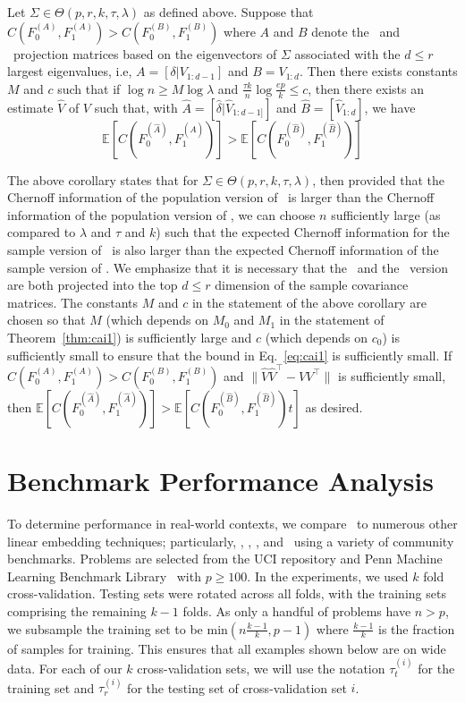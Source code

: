 \documentclass[11pt]{extarticle}
\begin{document}
\begin{coro}
Let $\Sigma \in \Theta(p,r,k,\tau,\lambda)$ as defined above. Suppose that $C(F_0^{(A)}, F_1^{(A)}) > C(F_0^{(B)}, F_1^{(B)})$ where $A$ and $B$ denote the \Lol~and \Pca~projection matrices based on the eigenvectors of $\Sigma$ associated with the $d \leq r$ largest eigenvalues, i.e, $A = [\delta | V_{1:d-1}]$ and $B = V_{1:d}$. Then there exists constants $M$ and $c$ such that if
$\log n \geq M \log \lambda$ and $\tfrac{\tau k}{n} \log \tfrac{ep}{k} \leq c$,
then there exists an estimate $\hat{V}$ of $V$ such that, with $\hat{A} = [\hat{\delta} | \hat{V}_{1:d-1]}]$ and $\hat{B} = [\hat{V}_{1:d}]$, we have
$$ \mathbb{E}[C(F_0^{(\hat{A})}, F_1^{(\hat{A})})] > \mathbb{E}[C(F_0^{(\hat{B})}, F_1^{(\hat{B})})]$$
\end{coro}
The above corollary states that for $\Sigma \in \Theta(p,r,k,\tau,\lambda)$, then provided that the Chernoff information of the population version of \Lol~is larger than the Chernoff information of the population version of \Pca, we can choose $n$ sufficiently large (as compared to $\lambda$ and $\tau$ and $k$) such that the expected Chernoff information for the sample version of \Lol~is also larger than the expected Chernoff information of the sample version of \Pca. We emphasize that it is necessary that the \Lol~and the \Pca~version are both projected into the top $d \leq r$ dimension of the sample covariance matrices. The constants $M$ and $c$ in the statement of the above corollary are chosen so that $M$ (which depends on $M_0$ and $M_1$ in the statement of Theorem~\ref{thm:cai1}) is sufficiently large and $c$ (which depends on $c_0$) is sufficiently small to ensure that the bound in Eq.~\eqref{eq:cai1} is sufficiently small. If $C(F_0^{(A)}, F_1^{(A)}) > C(F_0^{(B)}, F_1^{(B)})$ and $\|\hat{V} \hat{V}^{\top} - VV^{\top}\|$ is sufficiently small, then $\mathbb{E}[C(F_0^{(\hat{A})}, F_1^{(\hat{A})})] > \mathbb{E}[C(F_0^{(\hat{B})}, F_1^{(\hat{B})})t]$ as desired.



\section{Benchmark Performance Analysis}
\label{sec:realdata}


To determine performance in real-world contexts, we compare \Lol~to numerous other linear embedding techniques; particularly, \Pca, \Lda, \Pls, and \Cca~using a variety of community benchmarks. Problems are selected from the UCI repository and Penn Machine Learning Benchmark Library~\cite{Olson2017} with $p\ge 100$.
In the experiments, we used $k$ fold cross-validation. Testing sets were rotated across all folds, with the training sets comprising the remaining $k-1$ folds.  As only a handful of problems have $n>p$, we subsample the training set to be $\textrm{min}\left(n\frac{k-1}{k},p-1\right)$ where  $\frac{k-1}{k}$ is the fraction of samples for training. This ensures that all examples shown below are on wide data. For each of our $k$ cross-validation sets, we will use the notation $\tau_t^{(i)}$ for the training set and $\tau_r^{(i)}$ for the testing set of cross-validation set $i$.
\end{document}
